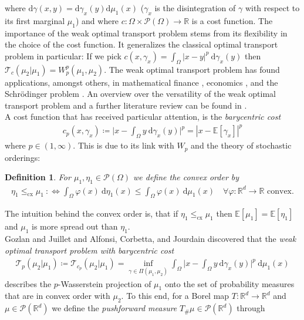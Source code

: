 \documentclass[10pt,a4paper]{amsart}
\newcommand{\RR}{\mathbb{R}}
\newcommand{\EE}{\mathbb{E}}
\newcommand{\dd}{\mathrm{d}}
\newtheorem{definition}[thm]{Definition}
\begin{document}
where $\dd\gamma(x,y)=\dd \gamma_x(y)\dd\mu_1(x)$ ($\gamma_x$ is the disintegration of $\gamma$ with respect to its first marginal $\mu_1$) and where $c:\Omega\times \mathcal P(\Omega)\rightarrow\RR$ is a cost function. The importance of the weak optimal transport problem stems from its flexibility in the choice of the cost function. It generalizes the classical optimal transport problem in particular: If we pick $c(x,\gamma_x)=\int_{\Omega}|x-y|^p\ \dd \gamma_x(y)$ then $\mathcal T_c(\mu_2|\mu_1)=W_p^p(\mu_1,\mu_2)$.
The weak optimal transport problem has found applications, amongst others, in mathematical finance \cite{acciaio2021}, economics \cite{paty2022}, and the Schr{\"o}dinger problem \cite{backhoff2022}. An overview over the versatility of the weak optimal transport problem and a further literature review can be found in \cite{backhoff2022}.\\
A cost function that has received particular attention, is the \textit{barycentric cost}
\begin{gather}\label{weakbarycentriccost}
	c_p(x,\gamma_x)\coloneqq\Big|x-\int_{\Omega}y\ \dd \gamma_x(y)\Big|^p=|x-\EE[\gamma_x]|^p
\end{gather}
where $p\in (1,\infty)$. This is due to its link with $W_p$ and the theory of stochastic orderings:
\begin{definition}
	For $\mu_1,\eta_1\in\mathcal P(\Omega)$ we define the \textit{convex order} by
	\begin{gather*}
		\eta_1\leq_{\text{cx}}\mu_1\ :\Leftrightarrow \int_{\Omega}\varphi(x)\ \dd\eta_1(x)\leq\int_{\Omega}\varphi(x)\ \dd\mu_1(x)\quad \forall\varphi:\RR^d\rightarrow\RR\text{ convex.}
	\end{gather*}
\end{definition}
The intuition behind the convex order is, that if $\eta_1\leq_{\text{cx}}\mu_1$ then $\EE[\mu_1]=\EE[\eta_1]$ and $\mu_1$ is more spread out than $\eta_1$.\\
Gozlan and Juillet \cite{gozlan2020} and Alfonsi, Corbetta, and Jourdain  \cite{alfonsi2020} discovered that the \textit{weak optimal transport problem with barycentric cost}
\begin{gather*}
	\mathcal T_p(\mu_2|\mu_1)\coloneqq\mathcal T_{c_p}(\mu_2|\mu_1)=\inf_{\gamma\in\Pi(\mu_1,\mu_2)}\int_{\Omega}\Big|x-\int_{\Omega}y\ \dd \gamma_x(y)\Big|^p\ \dd\mu_1(x)
\end{gather*}
describes the $p$-Wasserstein projection of $\mu_1$ onto the set of probability measures that are in convex order with $\mu_2$. To this end, for a Borel map $T:\RR^d\rightarrow\RR^d$ and $\mu\in\mathcal P(\RR^d)$ we define the \textit{pushforward measure} $T_\#\mu\in\mathcal P(\RR^d)$ through
\end{document}
